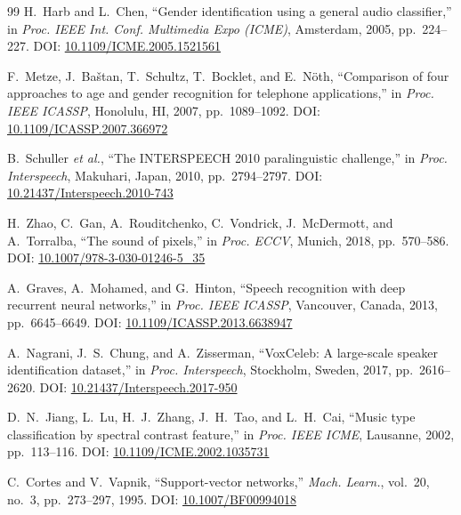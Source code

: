 \documentclass[conference]{IEEEtran}
\begin{document}
\begin{thebibliography}{99}
H.~Harb and L.~Chen,
``Gender identification using a general audio classifier,''
in \emph{Proc. IEEE Int. Conf. Multimedia Expo (ICME)},
Amsterdam, 2005, pp.~224--227.
\newblock DOI: \href{https://doi.org/10.1109/ICME.2005.1521561}{10.1109/ICME.2005.1521561}

F.~Metze, J.~Ba\v{s}tan, T.~Schultz, T.~Bocklet, and E.~N\"{o}th,
``Comparison of four approaches to age and gender recognition for telephone
applications,''
in \emph{Proc. IEEE ICASSP}, Honolulu, HI, 2007, pp.~1089--1092.
\newblock DOI: \href{https://doi.org/10.1109/ICASSP.2007.366972}{10.1109/ICASSP.2007.366972}

B.~Schuller \emph{et al.},
``The INTERSPEECH 2010 paralinguistic challenge,''
in \emph{Proc. Interspeech}, Makuhari, Japan, 2010, pp.~2794--2797.
\newblock DOI: \href{https://doi.org/10.21437/Interspeech.2010-743}{10.21437/Interspeech.2010-743}

H.~Zhao, C.~Gan, A.~Rouditchenko, C.~Vondrick, J.~McDermott,
and A.~Torralba,
``The sound of pixels,''
in \emph{Proc. ECCV}, Munich, 2018, pp.~570--586.
\newblock DOI: \href{https://doi.org/10.1007/978-3-030-01246-5_35}{10.1007/978-3-030-01246-5\_35}

A.~Graves, A.~Mohamed, and G.~Hinton,
``Speech recognition with deep recurrent neural networks,''
in \emph{Proc. IEEE ICASSP}, Vancouver, Canada, 2013, pp.~6645--6649.
\newblock DOI: \href{https://doi.org/10.1109/ICASSP.2013.6638947}{10.1109/ICASSP.2013.6638947}

A.~Nagrani, J.~S.~Chung, and A.~Zisserman,
``VoxCeleb: A large-scale speaker identification dataset,''
in \emph{Proc. Interspeech}, Stockholm, Sweden, 2017, pp.~2616--2620.
\newblock DOI: \href{https://doi.org/10.21437/Interspeech.2017-950}{10.21437/Interspeech.2017-950}

D.~N.~Jiang, L.~Lu, H.~J.~Zhang, J.~H.~Tao, and L.~H.~Cai,
``Music type classification by spectral contrast feature,''
in \emph{Proc. IEEE ICME}, Lausanne, 2002, pp.~113--116.
\newblock DOI: \href{https://doi.org/10.1109/ICME.2002.1035731}{10.1109/ICME.2002.1035731}

C.~Cortes and V.~Vapnik,
``Support-vector networks,''
\emph{Mach. Learn.}, vol.~20, no.~3, pp.~273--297, 1995.
\newblock DOI: \href{https://doi.org/10.1007/BF00994018}{10.1007/BF00994018}


\end{thebibliography}
\end{document}
